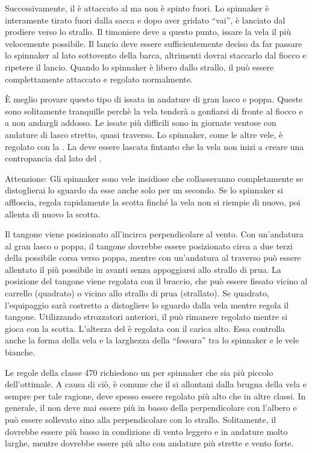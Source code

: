 Successivamente, il \pole è attaccato al \guy ma non è spinto fuori. Lo
spinnaker è interamente tirato fuori dalla sacca e dopo aver gridato ``vai'', è
lanciato dal prodiere verso lo strallo. Il timoniere deve a questo punto, issare
la vela il più velocemente possibile. Il lancio deve essere sufficientemente
deciso da far passare lo spinnaker al lato sottovento della barca, altrimenti
dovrai staccarlo dal fiocco e ripetere il lancio. Quando lo spinnaker è libero
dallo strallo, il \pole può essere complettamente attaccato e regolato
normalmente.

È meglio provare questo tipo di issata in andature di gran lasco e poppa. Queste sono
solitamente tranquille perchè la vela tenderà a gonfiarsi di fronte al fiocco e
a non andargli addosso. Le issate più difficili sono in giornate ventose con
andature di lasco stretto, quasi traverso. Lo spinnaker, come le altre vele, è
regolato con la \sheet. La \sheet deve essere lascata fintanto che la vela non
inizi a creare una contropancia dal lato del \pole.

Attenzione: Gli spinnaker sono vele insidiose che collasseranno completamente se
distoglierai lo sguardo da esse anche solo per un secondo. Se lo spinnaker si
affloscia, regola rapidamente la scotta finché la vela non si riempie di nuovo,
poi allenta di nuovo la scotta.

Il tangone viene posizionato all'incirca perpendicolare al vento. Con
un'andatura al gran lasco o poppa, il tangone dovrebbe essere posizionato circa
a due terzi della possibile corsa verso poppa, mentre con un'andatura al
traverso può essere allentato il più possibile in avanti senza appoggiarsi allo
strallo di prua. La posizione del tangone viene regolata con il braccio, che può
essere fissato vicino al carrello (quadrato) o vicino allo strallo di prua
(strallato).
%
Se quadrato, l'equipaggio sarà costretto a distogliere lo sguardo dalla vela
mentre regola il tangone. Utilizzando strozzatori anteriori, il \guy può
rimanere regolato mentre si gioca con la scotta. L'altezza del \pole è regolata
con il carica alto. Essa controlla anche la forma della vela e la larghezza
della ``fessura'' tra lo spinnaker e le vele bianche.

Le regole della classe 470 richiedono un \pole per spinnaker che sia più
piccolo dell'ottimale. A causa di ciò, è comune che il \pole si allontani dalla
brugna della vela e sempre per tale ragione, deve spesso essere regolato più
alto che in altre classi. In generale, il \pole non deve mai essere più in basso
della perpendicolare con l'albero e può essere sollevato sino alla
perpendicolare con lo strallo. Solitamente, il \pole dovrebbe essere più basso
in condizione di vento leggero e in andature molto larghe, mentre dovrebbe
essere più alto con andature più strette e vento forte.

